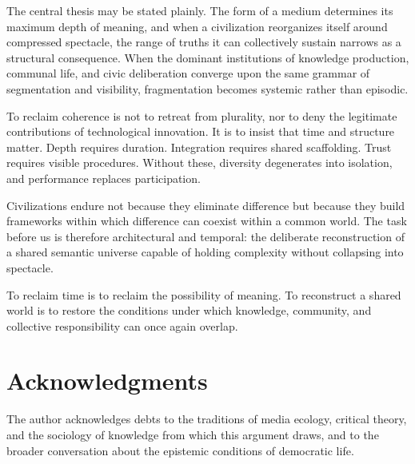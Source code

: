 \documentclass[12pt]{article}
\begin{document}
The central thesis may be stated plainly. The form of a medium determines its maximum depth of meaning, and when a civilization reorganizes itself around compressed spectacle, the range of truths it can collectively sustain narrows as a structural consequence. When the dominant institutions of knowledge production, communal life, and civic deliberation converge upon the same grammar of segmentation and visibility, fragmentation becomes systemic rather than episodic.

To reclaim coherence is not to retreat from plurality, nor to deny the legitimate contributions of technological innovation. It is to insist that time and structure matter. Depth requires duration. Integration requires shared scaffolding. Trust requires visible procedures. Without these, diversity degenerates into isolation, and performance replaces participation.

Civilizations endure not because they eliminate difference but because they build frameworks within which difference can coexist within a common world. The task before us is therefore architectural and temporal: the deliberate reconstruction of a shared semantic universe capable of holding complexity without collapsing into spectacle.

To reclaim time is to reclaim the possibility of meaning. To reconstruct a shared world is to restore the conditions under which knowledge, community, and collective responsibility can once again overlap.

\newpage

\section*{Acknowledgments}
The author acknowledges debts to the traditions of media ecology, critical theory, and the sociology of knowledge from which this argument draws, and to the broader conversation about the epistemic conditions of democratic life.
\end{document}
